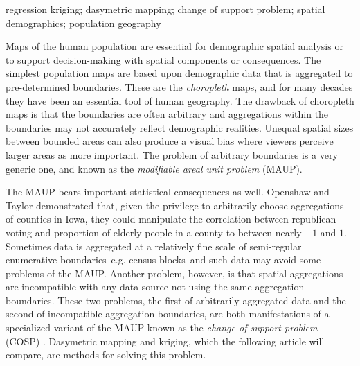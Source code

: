 \documentclass[draft]{article}
\begin{document}

\begin{keywords}
  regression kriging; dasymetric mapping; change of support problem; spatial demographics; population geography
\end{keywords}


Maps of the human population are essential for demographic spatial analysis or to support decision-making with spatial components or consequences.  The simplest population maps are based upon demographic data that is aggregated to pre-determined boundaries.  These are the {\em choropleth} maps, and for many decades they have been an essential tool of human geography.  The drawback of choropleth maps is that the boundaries are often arbitrary and aggregations within the boundaries may not accurately reflect demographic realities.  Unequal spatial sizes between bounded areas can also produce a visual bias where viewers perceive larger areas as more important.  The problem of arbitrary boundaries is a very generic one, and known as the {\em modifiable areal unit problem} (MAUP).

The MAUP bears important statistical consequences as well.  Openshaw and Taylor \cite{openshaw79} demonstrated that, given the privilege to arbitrarily choose aggregations of counties in Iowa, they could manipulate the correlation between republican voting and proportion of elderly people in a county to between nearly $-1$ and $1$.  Sometimes data is aggregated at a relatively fine scale of semi-regular enumerative boundaries--e.g. census blocks--and such data may avoid some problems of the MAUP.  Another problem, however, is that spatial aggregations are incompatible with any data source not using the same aggregation boundaries.  These two problems, the first of arbitrarily aggregated data and the second of incompatible aggregation boundaries, are both manifestations of a specialized variant of the MAUP known as the {\em change of support problem} (COSP) \cite{cressie96, gelfand01}.  Dasymetric mapping and kriging, which the following article will compare, are methods for solving this problem.
\end{document}

